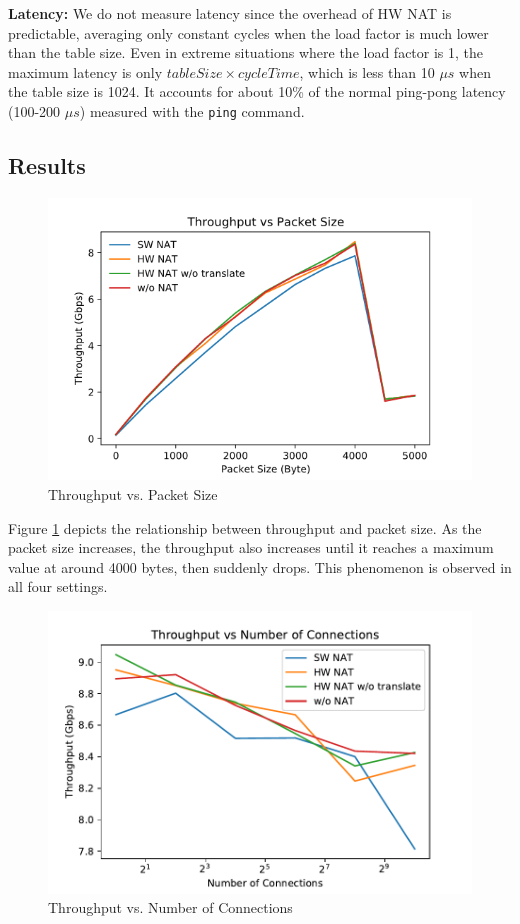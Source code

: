\textbf{Latency:} We do not measure latency since the overhead of HW NAT is predictable, averaging only constant cycles when the load factor is much lower than the table size. Even in extreme situations where the load factor is 1, the maximum latency is only $tableSize \times cycleTime$, which is less than 10 $\mu s$ when the table size is 1024. It accounts for about 10\% of the normal ping-pong latency (100-200 $\mu s$) measured with the \verb|ping| command.

\subsection{Results}

\begin{figure}[t]
    \includegraphics[width=\linewidth]{images/Result1.png}
    \caption{Throughput vs. Packet Size}
    \label{fig:thputpktsize}
\end{figure}

Figure \ref{fig:thputpktsize} depicts the relationship between throughput and packet size. As the packet size increases, the throughput also increases until it reaches a maximum value at around 4000 bytes, then suddenly drops. This phenomenon is observed in all four settings.

\begin{figure}[t]
    \includegraphics[width=\linewidth]{images/connection_throughput_log.pdf}
    \caption{Throughput vs. Number of Connections}
    \label{fig:thputconn}
\end{figure}

